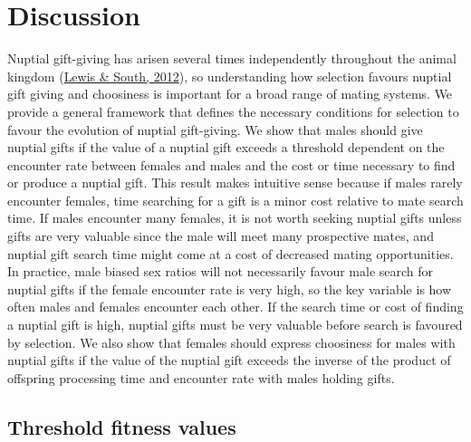 \documentclass[
]{article}
\begin{document}
\hypertarget{discussion}{%
\section{Discussion}\label{discussion}}

Nuptial gift-giving has arisen several times independently throughout
the animal kingdom (\protect\hyperlink{ref-Lewis2012}{Lewis \& South,
2012}), so understanding how selection favours nuptial gift giving and
choosiness is important for a broad range of mating systems. We provide
a general framework that defines the necessary conditions for selection
to favour the evolution of nuptial gift-giving. We show that males
should give nuptial gifts if the value of a nuptial gift exceeds a
threshold dependent on the encounter rate between females and males and
the cost or time necessary to find or produce a nuptial gift. This
result makes intuitive sense because if males rarely encounter females,
time searching for a gift is a minor cost relative to mate search time.
If males encounter many females, it is not worth seeking nuptial gifts
unless gifts are very valuable since the male will meet many prospective
mates, and nuptial gift search time might come at a cost of decreased
mating opportunities. In practice, male biased sex ratios will not
necessarily favour male search for nuptial gifts if the female encounter
rate is very high, so the key variable is how often males and females
encounter each other. If the search time or cost of finding a nuptial
gift is high, nuptial gifts must be very valuable before search is
favoured by selection. We also show that females should express
choosiness for males with nuptial gifts if the value of the nuptial gift
exceeds the inverse of the product of offspring processing time and
encounter rate with males holding gifts.

\hypertarget{threshold-fitness-values}{%
\subsection{Threshold fitness values}\label{threshold-fitness-values}}
\end{document}
